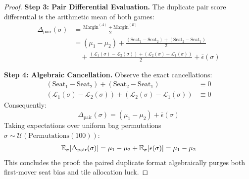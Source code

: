 \begin{proof}
\textbf{Step 3: Pair Differential Evaluation.}
The duplicate pair score differential is the arithmetic mean of both games:
\begin{align}
    \Delta_{\mathrm{pair}}(\sigma) &= \frac{\mathrm{Margin}^{(A)} + \mathrm{Margin}^{(B)}}{2} \nonumber \\
    &= (\mu_1 - \mu_2) + \frac{(\mathrm{Seat}_1 - \mathrm{Seat}_2) + (\mathrm{Seat}_2 - \mathrm{Seat}_1)}{2} \nonumber \\
    &\quad + \frac{(\mathcal{L}_1(\sigma) - \mathcal{L}_2(\sigma)) + (\mathcal{L}_2(\sigma) - \mathcal{L}_1(\sigma))}{2} + \bar{\epsilon}(\sigma)
\end{align}

\textbf{Step 4: Algebraic Cancellation.}
Observe the exact cancellations:
\begin{align}
    (\mathrm{Seat}_1 - \mathrm{Seat}_2) + (\mathrm{Seat}_2 - \mathrm{Seat}_1) &\equiv 0 \\
    (\mathcal{L}_1(\sigma) - \mathcal{L}_2(\sigma)) + (\mathcal{L}_2(\sigma) - \mathcal{L}_1(\sigma)) &\equiv 0
\end{align}
Consequently:
\begin{equation}
    \Delta_{\mathrm{pair}}(\sigma) = (\mu_1 - \mu_2) + \bar{\epsilon}(\sigma)
\end{equation}
Taking expectations over uniform bag permutations $\sigma \sim \mathcal{U}(\mathrm{Permutations}(100))$:
\begin{equation}
    \mathbb{E}_\sigma [\Delta_{\mathrm{pair}}(\sigma)] = \mu_1 - \mu_2 + \mathbb{E}_\sigma [\bar{\epsilon}(\sigma)] = \mu_1 - \mu_2
\end{equation}
This concludes the proof: the paired duplicate format algebraically purges both first-mover seat bias and tile allocation luck.
\end{proof}
